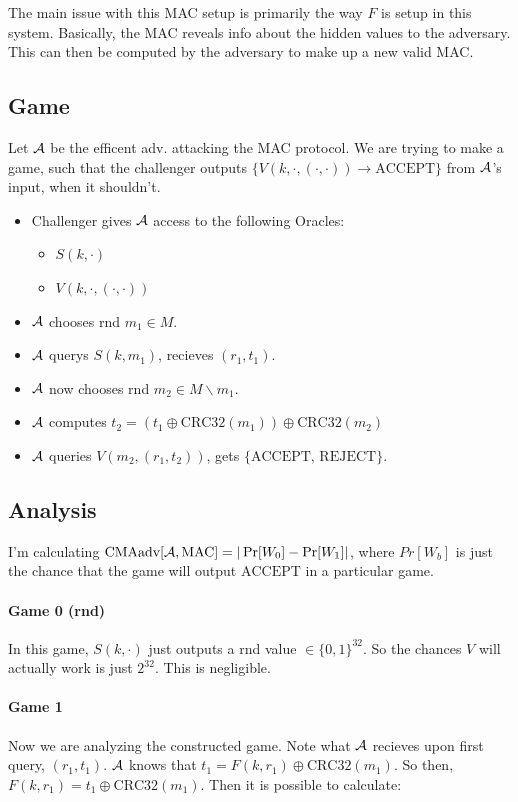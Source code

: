 \documentclass[12pt]{article}
\begin{document}
\begin{solution}
The main issue with this MAC setup is primarily the way $F$ is setup in this system. Basically, the MAC reveals info about the hidden values to the adversary. 
This can then be computed by the adversary to make up a new valid MAC.

\subsection*{Game}
Let $\mathcal{A}$ be the efficent adv. attacking the MAC protocol. We are trying to make a game, such that the challenger outputs $\{V(k, \cdot, (\cdot, \cdot)) \rightarrow \text{ACCEPT}\}$ from $\mathcal{A}$'s input,
when it shouldn't.

\begin{itemize}
    \item Challenger gives $\mathcal{A}$ access to the following Oracles:
    \begin{itemize}
        \item $S(k, \cdot)$
        \item $V(k, \cdot, (\cdot, \cdot))$
    \end{itemize}
    \item $\mathcal{A}$ chooses rnd $m_1 \in M$.
    \item $\mathcal{A}$ querys $S(k, m_1)$, recieves $(r_1, t_1)$.
    \item $\mathcal{A}$ now chooses rnd $m_2 \in M \backslash m_1$.
    \item $\mathcal{A}$ computes $t_2 = (t_1 \oplus \text{CRC32}(m_1)) \oplus \text{CRC32}(m_2)$
    \item $\mathcal{A}$ queries $V(m_2, (r_1, t_2))$, gets $\{\text{ACCEPT, REJECT}\}$.
\end{itemize}

\subsection*{Analysis}
I'm calculating $\text{CMAadv}[\mathcal{A}, \text{MAC}] = |\Pr[W_0] - \Pr[W_1]|$, where $Pr[W_b]$ is just the chance that the game will output $\text{ACCEPT}$ in a particular game.

\paragraph{Game 0 (rnd)} In this game, $S(k, \cdot)$ just outputs a rnd value $\in \{0, 1\}^{32}$. So the chances $V$ will actually work is just $2^{32}$. This is negligible.

\paragraph{Game 1} Now we are analyzing the constructed game. Note what $\mathcal{A}$ recieves upon first query, $(r_1, t_1)$. $\mathcal{A}$ knows that $t_1 = F(k, r_1) \oplus \text{CRC32}(m_1)$. So then,
$F(k, r_1) = t_1 \oplus \text{CRC32}(m_1)$. Then it is possible to calculate: 


\end{solution}
\end{document}
